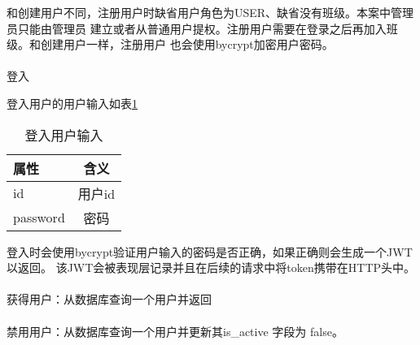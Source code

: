 和创建用户不同，注册用户时缺省用户角色为USER、缺省没有班级。本案中管理员只能由管理员
建立或者从普通用户提权。注册用户需要在登录之后再加入班级。和创建用户一样，注册用户
也会使用bycrypt加密用户密码。

\paragraph{}登入

登入用户的用户输入如表\ref{sign_in_in}
\begin{table}[htpb!]
    \centering
    \caption{\label{sign_in_in}登入用户输入}
    \begin{threeparttable}
        \begin{tabular}{lc}
            \toprule
            属性     & 含义   \\
            \midrule
            id       & 用户id \\
            password & 密码   \\
            \bottomrule
        \end{tabular}
    \end{threeparttable}
\end{table}

登入时会使用bycrypt验证用户输入的密码是否正确，如果正确则会生成一个JWT以返回。
该JWT会被表现层记录并且在后续的请求中将token携带在HTTP头中。

\paragraph{}获得用户：从数据库查询一个用户并返回

\paragraph{}禁用用户：从数据库查询一个用户并更新其is\_active 字段为 false。